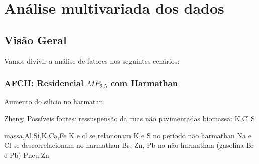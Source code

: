\chapter{Análise multivariada dos dados}

\section{Visão Geral}
Vamos divivir a análise de fatores nos seguintes cenários:







\subsection{AFCH: Residencial $MP_{2.5}$ \textbf{com} Harmathan}







Aumento do silicio no harmatan.

Zheng: 
Possíveis fontes: ressuspensão da ruas não pavimentadas
biomassa: K,Cl,S

massa,Al,Si,K,Ca,Fe
K e cl se relacionam
K e S no período não harmathan 
Na e Cl se descorrelacionam no harmathan
Br, Zn, Pb no não harmathan (gasolina-Br e Pb) Pneu:Zn



